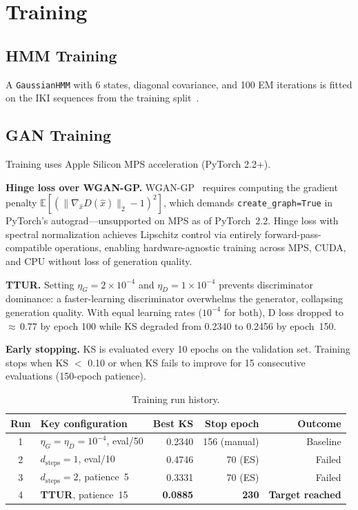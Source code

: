 \documentclass[sigconf,nonacm]{acmart}
\begin{document}
\section{Training}

\subsection{HMM Training}

A \texttt{GaussianHMM} with 6 states, diagonal covariance, and 100 EM iterations is
fitted on the IKI sequences from the training split~\cite{hmmlearn}.

\subsection{GAN Training}

Training uses Apple Silicon MPS acceleration (PyTorch 2.2+).

\textbf{Hinge loss over WGAN-GP.}
WGAN-GP~\cite{arjovsky2017wgan} requires computing the gradient penalty
$\mathbb{E}[(\|\nabla_{\hat{x}} D(\hat{x})\|_2 - 1)^2]$, which demands
\texttt{create\_graph=True} in PyTorch's autograd---unsupported on MPS as of PyTorch~2.2.
Hinge loss with spectral normalization achieves Lipschitz control via entirely
forward-pass-compatible operations, enabling hardware-agnostic training across MPS,
CUDA, and CPU without loss of generation quality.
\label{sec:hinge}

\textbf{TTUR.}
Setting $\eta_G = 2 \times 10^{-4}$ and $\eta_D = 1 \times 10^{-4}$ prevents
discriminator dominance: a faster-learning discriminator overwhelms the generator,
collapsing generation quality. With equal learning rates ($10^{-4}$ for both), D loss
dropped to ${\approx}\,0.77$ by epoch 100 while KS degraded from 0.2340 to 0.2456 by
epoch~150.

\textbf{Early stopping.}
KS is evaluated every 10 epochs on the validation set. Training stops when KS $<$ 0.10
or when KS fails to improve for 15 consecutive evaluations (150-epoch patience).

\begin{table}[t]
\centering
\caption{Training run history.}
\begin{tabular}{clrrr}
\toprule
Run & Key configuration & Best KS & Stop epoch & Outcome \\
\midrule
1 & $\eta_G{=}\eta_D{=}10^{-4}$, eval/50  & 0.2340 & 156 (manual) & Baseline \\
2 & $d_\text{steps}{=}1$, eval/10          & 0.4746 & 70 (ES)      & Failed \\
3 & $d_\text{steps}{=}2$, patience~5       & 0.3331 & 70 (ES)      & Failed \\
4 & \textbf{TTUR}, patience~15            & \textbf{0.0885} & \textbf{230} & \textbf{Target reached} \\
\bottomrule
\end{tabular}
\label{tab:training_runs}
\end{table}
\end{document}
